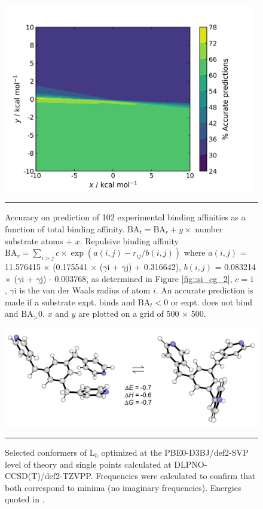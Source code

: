 \documentclass[../../main.tex]{subfiles}
\begin{document}
\begin{figure}[h!]
	\vspace{0.4cm}
	\centering
	\includegraphics[width=11cm]{3/cgbind/figs/figS4}
	\vspace{0.2cm}
	\hrule
	\caption{Accuracy on prediction of 102 experimental binding affinities as a function of total binding affinity. $\text{BA}_t = \text{BA}_r + y \times$ number substrate atoms + $x$. Repulsive binding affinity $\text{BA}_r = \sum_{i>j} c \times \exp(a(i, j) - r_{ij}/b(i, j))$ where $a(i, j)$ = 11.576415 $\times$ (0.175541 $\times$ ($\gamma$i + $\gamma$j) + 0.316642), $b(i, j)$ = 0.083214 $\times$ ($\gamma$i + $\gamma$j) - 0.003768, as determined in Figure \ref{fig::si_cg_2}, $c = 1$ \kcal, $\gamma$i is the van der Waals radius of atom $i$. An accurate prediction is made if a substrate expt. binds and $\text{BA}_{t} < 0$ or expt. does not bind and $\text{BA}_ > 0$. $x$ and $y$ are plotted on a grid of 500 × 500.}
	\label{fig::sicg_4}
\end{figure}


\begin{figure}[h!]
	\vspace{0.4cm}
	\centering
	\includegraphics[width=13cm]{3/cgbind/figs/figS5}
	\vspace{0.2cm}
	\hrule
	\caption{Selected conformers of L$_h$ optimized at the PBE0-D3BJ/def2-SVP level of theory and single points calculated at DLPNO-CCSD(T)/def2-TZVPP. Frequencies were calculated to confirm that both correspond to minima (no imaginary frequencies). Energies quoted in \kcal.}
	\label{fig::si_cg_5}
\end{figure}
\end{document}
